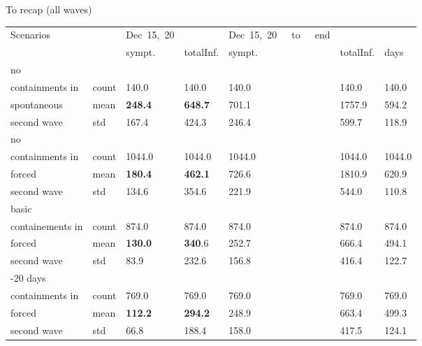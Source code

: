 \documentclass[9pt]{beamer}
\begin{document}
\begin{frame}{To recap (all waves)}

\begin{table}[H]
\center
\footnotesize
\begin{tabular}{p{1.8cm}p{0.5cm}p{0.5cm}p{0.5cm}p{0.5cm}p{0.5cm}p{0.5cm}}
\toprule
Scenarios     &    &  Dec~15,~20 &               & Dec~15,~20~~~to~~~end  &  &\\
                     &    & sympt.           &  totalInf. &  sympt. &  totalInf.  & days   \\                               

\midrule
no \\
containments in   & count & 140.0 &                      140.0 &                140.0 &                   140.0 &  140.0 \\
spontaneous         &  mean  &  \textbf{248.4} &                      \textbf{648.7} &      701.1 &                  1757.9 &  594.2 \\
second wave         & std  &  167.4 &                      424.3 &               246.4 &                   599.7 &  118.9 \\

\midrule
no \\
containments in   & count &     1044.0 &                     1044.0 &             1044.0 &                  1044.0 & 1044.0 \\
forced         & mean  &       \textbf{180.4} &                      \textbf{462.1} &          726.6 &                  1810.9 &  620.9 \\
second wave         & std   & 134.6 &                      354.6 &           221.9 &                   544.0 &  110.8 \\

\midrule
basic \\
containements in   & count &     874.0 &                      874.0 &          874.0 &                   874.0 &  874.0 \\
forced                    & mean  &             \textbf{130.0} &                      \textbf{340}.6 &                 252.7 &                   666.4 &  494.1 \\
second wave         & std   &   83.9 &                      232.6 &                  156.8 &                   416.4 &  122.7 \\
         
\midrule
-20 days \\ 
containments in   & count &  769.0 &                      769.0 &               769.0 &                   769.0 &  769.0 \\
forced             & mean  &   \textbf{{\color{red}112.2}} &        \textbf{{\color{red} 294.2}} &       248.9 &        663.4 &  499.3 \\
second wave  & std   &   66.8 &                      188.4 &          158.0 &                   417.5 &  124.1 \\


\end{tabular}
\end{table}
\end{frame}
\end{document}
